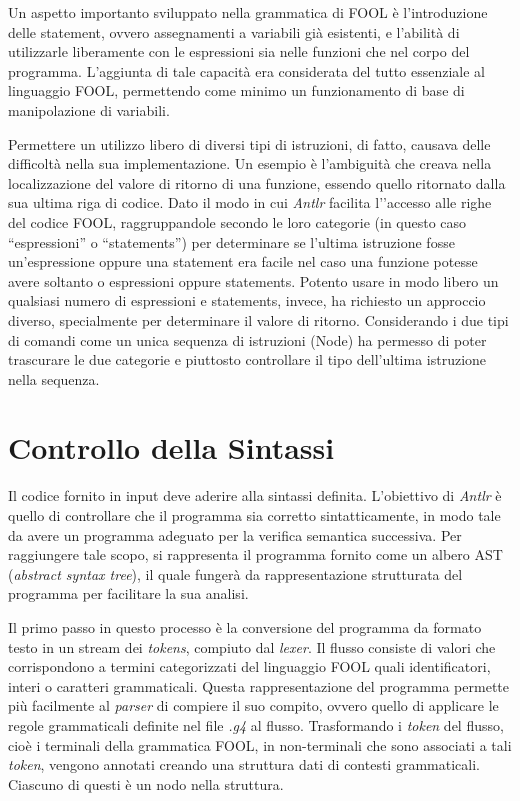 \documentclass{scrreprt}
\begin{document}
Un aspetto importanto sviluppato nella grammatica di FOOL è l'introduzione delle statement, 
ovvero assegnamenti a variabili già esistenti, e l'abilità di utilizzarle liberamente con le 
espressioni sia nelle funzioni che nel corpo del programma. L'aggiunta di tale capacità era 
considerata del tutto essenziale al linguaggio FOOL, permettendo come minimo un funzionamento
 di base di manipolazione di variabili. 

Permettere un utilizzo libero di diversi tipi di istruzioni, di fatto, causava delle difficoltà nella sua implementazione. Un 
esempio è l'ambiguità che creava nella localizzazione del valore di ritorno di una funzione, essendo 
quello ritornato dalla sua ultima riga di codice. Dato il modo in cui \textit{Antlr} facilita l'’accesso alle righe 
del codice FOOL, raggruppandole secondo le loro categorie (in questo caso ``espressioni'' o 
``statements'') per determinare se l’ultima istruzione fosse un'espressione oppure una statement era facile nel caso una funzione potesse avere soltanto o espressioni oppure statements. Potento usare
in modo libero un qualsiasi numero di espressioni e statements, invece, ha richiesto un approccio diverso, specialmente per determinare
 il valore di ritorno. Considerando i due tipi di comandi come un unica sequenza di istruzioni (Node) ha permesso di poter trascurare le due categorie
 e piuttosto controllare il tipo dell'ultima istruzione nella sequenza.

\section{Controllo della Sintassi}

Il codice fornito in input deve aderire alla sintassi definita. L’obiettivo di \textit{Antlr} è quello di controllare che il programma sia 
corretto sintatticamente, in modo tale da avere un programma adeguato per la 
verifica semantica successiva. Per raggiungere tale scopo, si rappresenta il programma 
fornito come un albero AST (\textit{abstract syntax tree}), il quale fungerà da rappresentazione strutturata 
del programma per facilitare la sua analisi. 

Il primo passo in questo processo è la conversione del programma da formato testo in un stream dei 
\textit{tokens}, compiuto dal \textit{lexer}. Il flusso consiste di valori che corrispondono a termini categorizzati del 
linguaggio FOOL quali identificatori, interi o caratteri grammaticali. Questa rappresentazione del 
programma permette più facilmente al \textit{parser} di compiere il suo compito, ovvero quello di applicare 
le regole grammaticali definite nel file \textit{.g4} al flusso. Trasformando i \textit{token} del flusso, cioè i terminali 
della grammatica FOOL, in non-terminali che sono associati a tali \textit{token}, vengono annotati creando 
una struttura dati di contesti grammaticali. Ciascuno di questi è un nodo nella struttura. 
\end{document}
